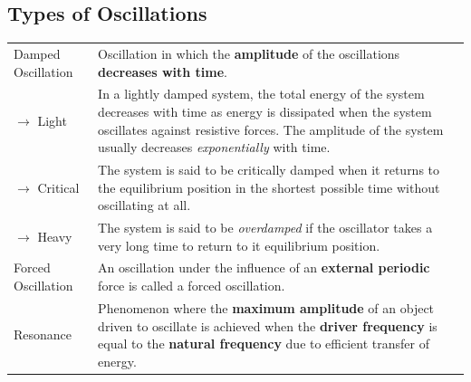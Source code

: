 \documentclass[a4paper,11pt]{article}
\begin{document}
		\subsection{Types of Oscillations}
			\begin{center}
				\renewcommand{\arraystretch}{1.6}
				\begin{tabular}{@{} l p{10.9cm} @{}}
					\toprule
					Damped Oscillation  & Oscillation in which the  \textbf{amplitude} of the oscillations \textbf{decreases with time}. \\
					$\rightarrow$ Light & In a lightly damped system, the total energy of the system decreases with time as energy is dissipated when the system oscillates against resistive forces. The amplitude of the system usually decreases \textit{exponentially} with time.\\
					$\rightarrow$ Critical & The system is said to be critically damped when it returns to the equilibrium position in the shortest possible time without oscillating at all. \\
					$\rightarrow$ Heavy & The system is said to be \textit{overdamped} if the oscillator takes a very long time to return to it equilibrium position.\\
					Forced Oscillation &  An oscillation under the influence of an \textbf{external periodic} force is called a forced oscillation.\\
					Resonance & Phenomenon where the \textbf{maximum amplitude} of an object driven to oscillate is achieved when the \textbf{driver frequency} is equal to the \textbf{natural frequency} due to efficient transfer of energy. \\
					\bottomrule
					\end{tabular}
			\end{center}
\end{document}
